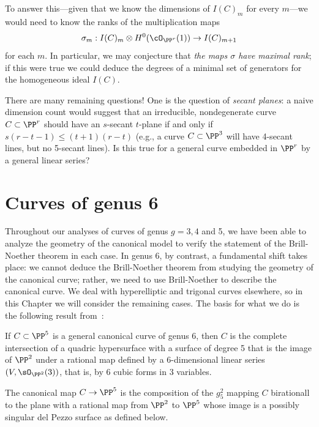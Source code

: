 To answer this---given that we know the dimensions of $I(C)_m$ for every $m$---we would need to know the ranks of the multiplication maps
$$
\sigma_m : I(C)_m \otimes H^0(\cO_{\PP^r}(1)) \to I(C)_{m+1}
$$
for each $m$. In particular, we may conjecture that \emph{the maps $\sigma$ have maximal rank}; if this were true we could deduce the degrees of a minimal set of generators for the homogeneous ideal $I(C)$.


There are many remaining questions! One is the question of \emph{secant planes}: a naive dimension count would suggest that an irreducible, nondegenerate curve $C \subset \PP^r$ should have an $s$-secant $t$-plane if and only if $s(r-t-1) \leq (t+1)(r-t)$
(e.g., a curve $C \subset \PP^3$ will have 4-secant lines, but no 5-secant lines). Is this true for a general curve embedded in $\PP^r$ by a general linear series?



\section{Curves of genus 6}\label{genus 6 section}


Throughout our analyses of curves of genus $g = 3, 4$ and 5, we have been able to analyze the geometry of the canonical model to verify the statement of the Brill-Noether theorem in each case. In genus 6, by contrast, a fundamental shift takes place: we cannot deduce the Brill-Noether theorem from studying the geometry of the canonical curve; rather, we need to use Brill-Noether to describe the canonical curve. We deal with hyperelliptic and trigonal curves elsewhere, so in this Chapter we will consider the remaining cases. The basis for what we do is the following result from~\cite{MR744297}:

\begin{theorem}
If $C\subset \PP^5$ is a general canonical curve of genus 6, then $C$ is the complete intersection of a quadric hypersurface
with a surface of degree 5 that is the image of $\PP^2$ under a rational map defined by a 6-dimensional linear series
$(V,\sO_{\PP^2}(3))$, that is, by 6 cubic forms in 3 variables. 

The canonical map $C\to \PP^5$ is the composition
of the $g^2_5$ mapping $C$ birationall to the plane with a rational map from $\PP^2$ to $\PP^5$ whose image is a 
possibly singular del Pezzo surface as defined below.
\end{theorem}

